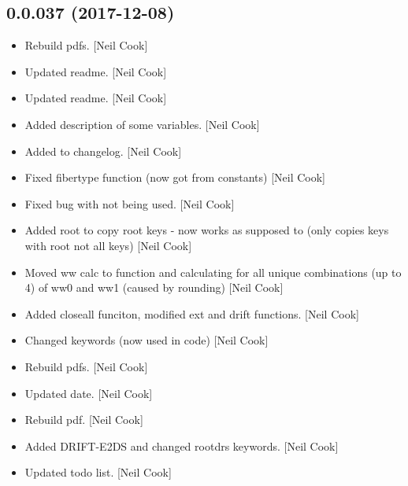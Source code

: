 \documentclass[a4paper,10pt,english]{report}
\begin{document}
\subsection{0.0.037 (2017-12-08)}
\label{\detokenize{misc/changelog:id515}}\begin{itemize}
\item {} 
Rebuild pdfs. {[}Neil Cook{]}

\item {} 
Updated readme. {[}Neil Cook{]}

\item {} 
Updated readme. {[}Neil Cook{]}

\item {} 
Added description of some variables. {[}Neil Cook{]}

\item {} 
Added to changelog. {[}Neil Cook{]}

\item {} 
Fixed fibertype function (now got from constants) {[}Neil Cook{]}

\item {} 
Fixed bug with  not being used. {[}Neil Cook{]}

\item {} 
Added root to copy root keys - now works as supposed to (only copies
keys with root not all keys) {[}Neil Cook{]}

\item {} 
Moved ww calc to function and calculating for all unique combinations
(up to 4) of ww0 and ww1 (caused by rounding) {[}Neil Cook{]}

\item {} 
Added closeall funciton, modified ext and drift functions. {[}Neil Cook{]}

\item {} 
Changed  keywords (now used in code) {[}Neil Cook{]}

\item {} 
Rebuild pdfs. {[}Neil Cook{]}

\item {} 
Updated date. {[}Neil Cook{]}

\item {} 
Rebuild pdf. {[}Neil Cook{]}

\item {} 
Added DRIFT-E2DS and changed rootdrs keywords. {[}Neil Cook{]}

\item {} 
Updated todo list. {[}Neil Cook{]}


\end{itemize}
\end{document}
